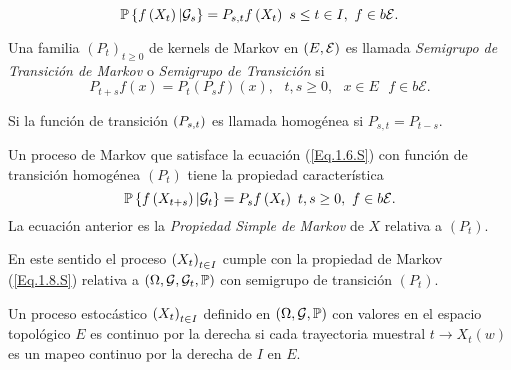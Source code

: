 \begin{equation}\label{Eq.1.6.S}
\mathbb{P}\left\{f\left(X_{t}\right)|\mathcal{G}_{s}\right\}=P_{s,t}f\left(X_{t}\right)\textrm{ }s\leq t\in I,\textrm{ }f\in b\mathcal{E}.
\end{equation}

\begin{Def}
Una familia $\left(P_{t}\right)_{t\geq0}$ de kernels de Markov en $\left(E,\mathcal{E}\right)$ es llamada {\em Semigrupo de Transici\'on de Markov} o {\em Semigrupo de Transici\'on} si
\[P_{t+s}f\left(x\right)=P_{t}\left(P_{s}f\right)\left(x\right),\textrm{ }t,s\geq0,\textrm{ }x\in E\textrm{ }f\in b\mathcal{E}.\]
\end{Def}
\begin{Note}
Si la funci\'on de transici\'on $\left(P_{s,t}\right)$ es llamada homog\'enea si $P_{s,t}=P_{t-s}$.
\end{Note}

Un proceso de Markov que satisface la ecuaci\'on (\ref{Eq.1.6.S}) con funci\'on de transici\'on homog\'enea $\left(P_{t}\right)$ tiene la propiedad caracter\'istica
\begin{equation}\label{Eq.1.8.S}
\mathbb{P}\left\{f\left(X_{t+s}\right)|\mathcal{G}_{t}\right\}=P_{s}f\left(X_{t}\right)\textrm{ }t,s\geq0,\textrm{ }f\in b\mathcal{E}.
\end{equation}
La ecuaci\'on anterior es la {\em Propiedad Simple de Markov} de $X$ relativa a $\left(P_{t}\right)$.

En este sentido el proceso $\left(X_{t}\right)_{t\in I}$ cumple con la propiedad de Markov (\ref{Eq.1.8.S}) relativa a $\left(\Omega,\mathcal{G},\mathcal{G}_{t},\mathbb{P}\right)$ con semigrupo de transici\'on $\left(P_{t}\right)$.
\begin{Def}
Un proceso estoc\'astico $\left(X_{t}\right)_{t\in I}$ definido en $\left(\Omega,\mathcal{G},\mathbb{P}\right)$ con valores en el espacio topol\'ogico $E$ es continuo por la derecha si cada trayectoria muestral $t\rightarrow X_{t}\left(w\right)$ es un mapeo continuo por la derecha de $I$ en $E$.
\end{Def}

